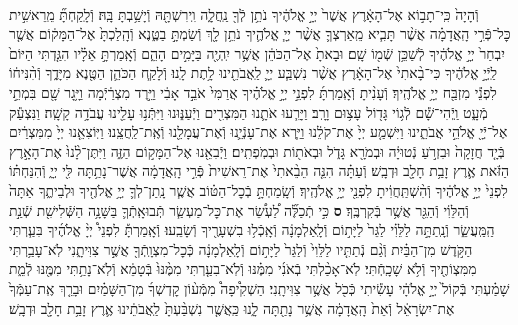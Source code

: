 \documentclass[twoside, openany, parskip=half, 11pt]{book}
\begin{document}
\begin{footnotesize}
\begin{multicols}{2}
\\
וְֿהָיָה֙ כִּֽי־תָב֣וֹא אֶל־הָאָ֔רֶץ אֲשֶׁר֙ יְיָ֣ אֱלֹהֶ֔יךָ נֹתֵ֥ן לְֿךָ֖ נַֽחֲלָ֑ה וִֽירִשְׁתָּ֖הּ וְֿיָשַׁ֥בְתָּ בָּֽהּ׃ וְֿלָֽקַחְתָּ֞ מֵֽרֵאשִׁ֣ית כׇּל־פְּֿרִ֣י הָֽאֲדָמָ֗ה אֲשֶׁ֨ר תָּבִ֧יא מֵֽאַרְצְךָ֛ אֲשֶׁ֨ר יְיָ֧ אֱלֹהֶ֛יךָ נֹתֵ֥ן לָ֖ךְ וְֿשַׂמְתָּ֣ בַטֶּ֑נֶא וְֿהָֽלַכְתָּ֙ אֶל־הַמָּק֔וֹם אֲשֶׁ֤ר יִבְחַר֙ יְיָ֣ אֱלֹהֶ֔יךָ לְֿשַׁכֵּ֥ן שְֿׁמ֖וֹ שָֽׁם׃ וּבָאתָ֙ אֶל־הַכֹּהֵ֔ן אֲשֶׁ֥ר יִֽהְיֶ֖ה בַּיָּמִ֣ים הָהֵ֑ם וְֿאָֽמַרְתָּ֣ אֵלָ֗יו הִגַּ֤דְתִּי הַיּוֹם֙ לַֽיְֿיָ֣ אֱלֹהֶ֔יךָ כִּי־בָ֨אתִי֙ אֶל־הָאָ֔רֶץ אֲשֶׁ֨ר נִשְׁבַּ֧ע יְיָ֛ לַֽאֲבֹתֵ֖ינוּ לָ֥תֶת לָֽנוּ׃
וְֿלָקַ֧ח הַכֹּהֵ֛ן הַטֶּ֖נֶא מִיָּדֶ֑ךָ וְֿהִ֨נִּיח֔וֹ לִפְנֵ֕י מִזְבַּ֖ח יְיָ֥ אֱלֹהֶֽיךָ׃ וְֿעָנִ֨יתָ וְֿאָֽמַרְתָּ֜ לִפְנֵ֣י יְיָ֣ אֱלֹהֶ֗יךָ אֲרַמִּי֙ אֹבֵ֣ד אָבִ֔י וַיֵּ֣רֶד מִצְרַ֔יְֿמָה וַיָּ֥גָר שָׁ֖ם בִּמְתֵ֣י מְֿעָ֑ט וַֽיְֿהִי־שָׁ֕ם לְֿג֥וֹי גָּד֖וֹל עָצ֥וּם וָרָֽב׃ וַיָּרֵ֧עוּ אֹתָ֛נוּ הַמִּצְרִ֖ים וַיְֿעַנּ֑וּנוּ וַיִּתְּֿנ֥וּ עָלֵ֖ינוּ עֲבֹדָ֥ה קָשָֽׁה׃ וַנִּצְעַ֕ק אֶל־יְֿיָ֖ אֱלֹהֵ֣י אֲבֹתֵ֑ינוּ וַיִּשְׁמַ֤ע יְיָ֙ אֶת־קֹלֵ֔נוּ וַיַּ֧רְא אֶת־עָנְֿיֵ֛נוּ וְֿאֶת־עֲמָלֵ֖נוּ וְֿאֶֽת־לַֽחֲצֵֽנוּ׃ וַיּֽוֹצִאֵ֤נוּ יְיָ֙ מִמִּצְרַ֔יִם בְּֿיָ֤ד חֲזָקָה֙ וּבִזְרֹ֣עַ נְֿטוּיָ֔ה וּבְמֹרָ֖א גָּדֹ֑ל וּבְאֹת֖וֹת וּבְמֹֽפְתִֽים׃ וַיְֿבִאֵ֖נוּ אֶל־הַמָּק֣וֹם הַזֶּ֑ה וַיִּתֶּן־לָ֨נוּ֙ אֶת־הָאָ֣רֶץ הַזֹּ֔את אֶ֛רֶץ זָבַ֥ת חָלָ֖ב וּדְבָֽשׁ׃ וְֿעַתָּ֗ה הִנֵּ֤ה הֵבֵ֨אתִי֙ אֶת־רֵאשִׁית֙ פְּֿרִ֣י הָֽאֲדָמָ֔ה אֲשֶׁר־נָתַ֥תָּה לִּ֖י יְיָ֑ וְֿהִנַּחְתּ֗וֹ לִפְנֵי֙ יְיָ֣ אֱלֹהֶ֔יךָ וְֿהִ֨שְׁתַּֽחֲוִ֔יתָ לִפְנֵ֖י יְיָ֥ אֱלֹהֶֽיךָ׃ וְֿשָֽׂמַחְתָּ֣ בְֿכׇל־הַטּ֗וֹב אֲשֶׁ֧ר נָֽתַן־לְךָ֛ יְיָ֥ אֱלֹהֶ֖יךָ וּלְבֵיתֶ֑ךָ אַתָּה֙ וְֿהַלֵּוִ֔י וְֿהַגֵּ֖ר אֲשֶׁ֥ר בְּֿקִרְבֶּֽךָ׃ \textbf{ס}
כִּ֣י תְֿכַלֶּ֞ה לַ֠עְשֵׂ֠ר אֶת־כׇּל־מַעְשַׂ֧ר תְּֿבוּאָֽתְֿךָ֛ בַּשָּׁנָ֥ה הַשְּֿׁלִישִׁ֖ת שְֿׁנַ֣ת הַֽמַּֽעֲשֵׂ֑ר וְֿנָֽתַתָּ֣ה לַלֵּוִ֗י לַגֵּר֙ לַיָּת֣וֹם וְֿלָֽאַלְמָנָ֔ה וְֿאָֽכְֿל֥וּ בִשְׁעָרֶ֖יךָ וְֿשָׂבֵֽעוּ׃ וְֿאָֽמַרְתָּ֡ לִפְנֵי֩ יְיָ֨ אֱלֹהֶ֜יךָ בִּעַ֧רְתִּי הַקֹּ֣דֶשׁ מִן־הַבַּ֗יִת וְֿגַ֨ם נְֿתַתִּ֤יו לַלֵּוִי֙ וְֿלַגֵּר֙ לַיָּת֣וֹם וְֿלָֽאַלְמָנָ֔ה כְּֿכׇל־מִצְוָֽתְֿךָ֖ אֲשֶׁ֣ר צִוִּיתָ֑נִי לֹֽא־עָבַ֥רְתִּי מִמִּצְוֹתֶ֖יךָ וְֿלֹ֥א שָׁכָֽחְֿתִּי׃ לֹֽא־אָכַ֨לְתִּי בְֿאֹנִ֜י מִמֶּ֗נּוּ וְֿלֹֽא־בִעַ֤רְתִּי מִמֶּ֨נּוּ֙ בְּֿטָמֵ֔א וְֿלֹֽא־נָתַ֥תִּי מִמֶּ֖נּוּ לְֿמֵ֑ת שָׁמַ֗עְתִּי בְּֿקוֹל֙ יְיָ֣ אֱלֹהָ֔י עָשִׂ֕יתִי כְּֿכֹ֖ל אֲשֶׁ֥ר צִוִּיתָֽנִי׃ הַשְׁקִ֩יפָה֩ מִמְּֿע֨וֹן קׇדְשְׁךָ֜ מִן־הַשָּׁמַ֗יִם וּבָרֵ֤ךְ אֶֽת־עַמְּֿךָ֙ אֶת־יִשְׂרָאֵ֔ל וְֿאֵת֙ הָֽאֲדָמָ֔ה אֲשֶׁ֥ר נָתַ֖תָּה לָ֑נוּ כַּֽאֲשֶׁ֤ר נִשְׁבַּ֨עְתָּ֙ לַֽאֲבֹתֵ֔ינוּ אֶ֛רֶץ זָבַ֥ת חָלָ֖ב וּדְבָֽשׁ׃


\end{multicols}
\end{footnotesize}
\end{document}
